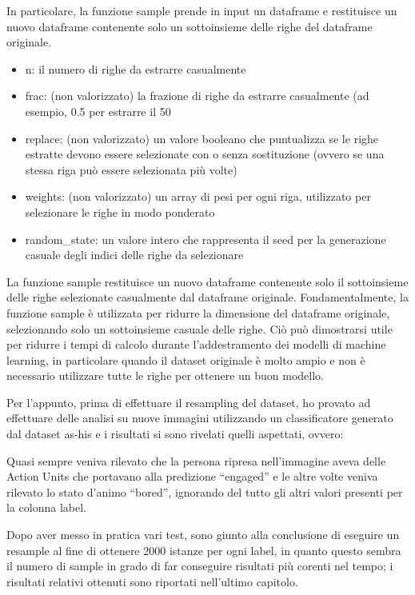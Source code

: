 \begin{enumerate}
In particolare, la funzione sample prende in input un dataframe e restituisce un nuovo dataframe contenente solo un sottoinsieme delle righe del dataframe originale.
\begin{itemize}
    \item n: il numero di righe da estrarre casualmente
    \item frac: (non valorizzato) la frazione di righe da estrarre casualmente (ad esempio, 0.5 per estrarre il 50%
    \item replace: (non valorizzato) un valore booleano che puntualizza se le righe estratte devono essere selezionate con o senza sostituzione (ovvero se una stessa riga può essere selezionata più volte)
    \item weights: (non valorizzato) un array di pesi per ogni riga, utilizzato per selezionare le righe in modo ponderato
    \item random\_state: un valore intero che rappresenta il seed per la generazione casuale degli indici delle righe da selezionare
\end{itemize}
La funzione sample restituisce un nuovo dataframe contenente solo il sottoinsieme delle righe selezionate casualmente dal dataframe originale. 
Fondamentalmente, la funzione sample è utilizzata per ridurre la dimensione del dataframe originale, selezionando solo un sottoinsieme casuale delle righe.
Ciò può dimostrarsi utile per ridurre i tempi di calcolo durante l'addestramento dei modelli di machine learning, in particolare quando il dataset originale è molto ampio e non è necessario utilizzare tutte le righe per ottenere un buon modello.
\end{enumerate}

Per l’appunto, prima di effettuare il resampling del dataset, ho provato ad effettuare delle analisi su nuove immagini utilizzando un classificatore generato dal dataset as-his e i risultati si sono rivelati quelli aspettati, ovvero:

Quasi sempre veniva rilevato che la persona ripresa nell’immagine aveva delle Action Units che portavano alla predizione “engaged” e le altre volte veniva rilevato lo stato d’animo “bored”, ignorando del tutto gli altri valori presenti per la colonna label.

Dopo aver messo in pratica vari test, sono giunto alla conclusione di eseguire un resample al fine di ottenere 2000 istanze per ogni label, in quanto questo sembra il numero di sample in grado di far conseguire risultati più corenti nel tempo; i risultati relativi ottenuti sono riportati nell’ultimo capitolo. 

